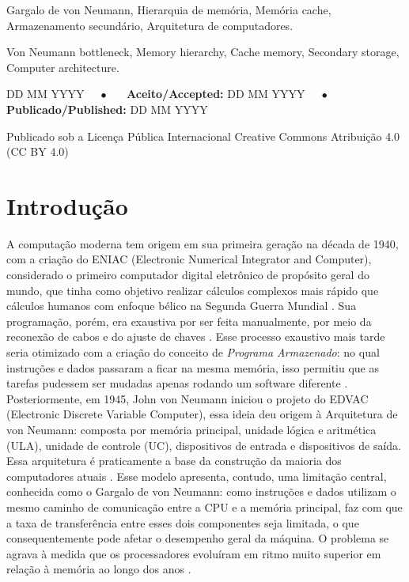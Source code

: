\documentclass[portuguese]{sbcreviews-2025}%
\begin{document}
\begin{frontmatter}
\begin{pchaves}
Gargalo de von Neumann, Hierarquia de memória, Memória cache,
Armazenamento secundário, Arquitetura de computadores.
\end{pchaves}

\begin{keywords}
Von Neumann bottleneck, Memory hierarchy, Cache memory, Secondary
storage, Computer architecture.
\end{keywords}

\begin{dates}
 DD MM YYYY~~~$\bullet$~~~
{\sffamily\textbf{Aceito/Accepted:}} DD MM YYYY~~~$\bullet$~~~
{\sffamily\textbf{Publicado/Published:}} DD MM YYYY
\end{dates}


\begin{license}
Publicado sob a Licença Pública Internacional Creative Commons Atribuição 4.0 (CC BY 4.0)
\end{license}

\end{frontmatter}

\break
\newpage

\section{Introdução}
\label{sec:intro}

A computação moderna tem origem em sua primeira geração na década de 1940, com a criação do ENIAC (Electronic Numerical Integrator and Computer), 
considerado o primeiro computador digital eletrônico de propósito geral do mundo, que tinha como objetivo realizar cálculos complexos  mais rápido que cálculos 
humanos com enfoque bélico na Segunda Guerra Mundial \citep{stallings2010}. Sua programação, porém, era exaustiva por ser feita manualmente, por meio da reconexão de 
cabos e do ajuste de chaves \citep{miletto2014}. Esse processo exaustivo mais tarde seria otimizado com a criação do conceito de \textit{Programa Armazenado}: no qual 
instruções e dados passaram a ficar na mesma memória, isso permitiu que as tarefas pudessem ser mudadas apenas rodando um software diferente \citep{stallings2010}. 
Posteriormente, em 1945, John von Neumann iniciou o projeto do EDVAC (Electronic Discrete Variable Computer), essa ideia deu origem à Arquitetura de von Neumann: composta 
por memória principal, unidade lógica e aritmética (ULA), unidade de controle (UC), dispositivos de entrada e dispositivos de saída. Essa arquitetura é praticamente a base 
da construção da maioria dos computadores atuais \citep{tanenbaum2013}. Esse modelo apresenta, contudo, uma limitação central,  conhecida como o Gargalo de von Neumann: como 
instruções e dados utilizam o mesmo caminho de comunicação entre a CPU e a memória principal, faz com que a taxa de transferência entre esses dois componentes seja limitada, o 
que consequentemente pode afetar o desempenho geral da máquina. O problema se agrava à medida que os processadores evoluíram em ritmo muito superior em relação à memória ao longo 
dos anos \citep{couto2017}.
\end{document}
